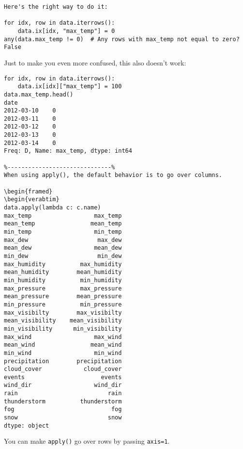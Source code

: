 \begin{framed}
\begin{verbatim}
Here's the right way to do it:

for idx, row in data.iterrows():
    data.ix[idx, "max_temp"] = 0
any(data.max_temp != 0)  # Any rows with max_temp not equal to zero?
False
\end{verbatim}
\end{framed}
Just to make you even more confused, this also doesn't work:

\begin{framed}
\begin{verbatim}
for idx, row in data.iterrows():
    data.ix[idx]["max_temp"] = 100
data.max_temp.head()
date
2012-03-10    0
2012-03-11    0
2012-03-12    0
2012-03-13    0
2012-03-14    0
Freq: D, Name: max_temp, dtype: int64

%------------------------------%
When using apply(), the default behavior is to go over columns.

\begin{framed}
\begin{verabtim}
data.apply(lambda c: c.name)
max_temp                  max_temp
mean_temp                mean_temp
min_temp                  min_temp
max_dew                    max_dew
mean_dew                  mean_dew
min_dew                    min_dew
max_humidity          max_humidity
mean_humidity        mean_humidity
min_humidity          min_humidity
max_pressure          max_pressure
mean_pressure        mean_pressure
min_pressure          min_pressure
max_visibilty        max_visibilty
mean_visibility    mean_visibility
min_visibility      min_visibility
max_wind                  max_wind
mean_wind                mean_wind
min_wind                  min_wind
precipitation        precipitation
cloud_cover            cloud_cover
events                      events
wind_dir                  wind_dir
rain                          rain
thunderstorm          thunderstorm
fog                            fog
snow                          snow
dtype: object
\end{verbatim}
\end{framed}
You can make \texttt{apply()} go over rows by passing \texttt{axis=1}.

